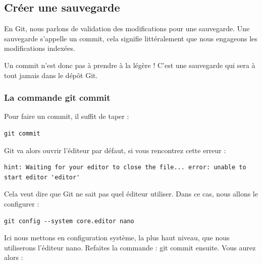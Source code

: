 \documentclass{article}
\begin{document}
\subsection{Créer une sauvegarde}
En {\color{blue}Git}, nous parlons de validation des modifications pour une sauvegarde. Une sauvegarde s'appelle un commit, cela signifie littéralement que nous engageons les modifications indexées.

Un commit n'est donc pas à prendre à la légère ! C'est une sauvegarde qui sera à tout jamais dans le dépôt {\color{blue}Git}.

\subsubsection*{La commande git commit}
Pour faire un commit, il suffit de taper :

\begin{verbatim}
git commit
\end{verbatim}

{\color{blue}Git} va alors ouvrir l'éditeur par défaut, si vous rencontrez cette erreur :

\begin{verbatim}
hint: Waiting for your editor to close the file... error: unable to start editor 'editor'
\end{verbatim}

Cela veut dire que {\color{blue}Git} ne sait pas quel éditeur utiliser. Dans ce cas, nous allons le configurer :

\begin{verbatim}
git config --system core.editor nano
\end{verbatim}

Ici nous mettons en configuration système, la plus haut niveau, que nous utiliserons l'éditeur {\color{blue}nano}. Refaites la commande : {\color{blue}git commit} ensuite. Vous aurez alors :
\end{document}
